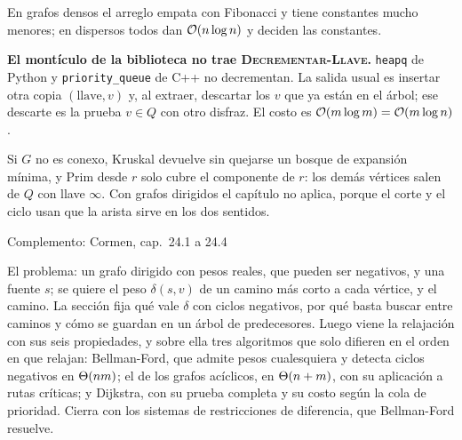 \documentclass[11pt,letterpaper]{article}
\begin{document}
En grafos densos el arreglo empata con Fibonacci y tiene constantes
mucho menores; en dispersos todos dan $\mathcal{O}\!\left(n \log n\right)$ y deciden las
constantes.

\begin{ojo}
  \textbf{El montículo de la biblioteca no trae
  \textsc{Decrementar-Llave}.} \texttt{heapq} de Python y
  \texttt{priority\_queue} de C++ no decrementan. La salida usual es
  insertar otra copia $(\text{llave}, v)$ y, al extraer, descartar los
  $v$ que ya están en el árbol; ese descarte es la prueba $v \in Q$ con
  otro disfraz. El costo es $\mathcal{O}\!\left(m \log m\right) = \mathcal{O}\!\left(m \log n\right)$.
\end{ojo}

\begin{ojo}
  Si $G$ no es conexo, Kruskal devuelve sin quejarse un bosque de
  expansión mínima, y Prim desde $r$ solo cubre el componente de $r$:
  los demás vértices salen de $Q$ con llave $\infty$. Con grafos
  dirigidos el capítulo no aplica, porque el corte y el ciclo usan que
  la arista sirve en los dos sentidos.
\end{ojo}

\newpage


  {Complemento: Cormen, cap.\ 24.1 a 24.4}
\label{sec:caminos-fuente}

\begin{quick_sum}
  El problema: un grafo dirigido con pesos reales, que pueden ser
  negativos, y una fuente $s$; se quiere el peso $\delta(s, v)$ de un
  camino más corto a cada vértice, y el camino. La sección fija qué
  vale $\delta$ con ciclos negativos, por qué basta buscar entre
  caminos y cómo se guardan en un árbol de predecesores. Luego viene
  la relajación con sus seis propiedades, y sobre ella tres
  algoritmos que solo difieren en el orden en que relajan:
  Bellman-Ford, que admite pesos cualesquiera y detecta ciclos
  negativos en $\Theta\!\left(nm\right)$; el de los grafos acíclicos, en
  $\Theta\!\left(n + m\right)$, con su aplicación a rutas críticas; y Dijkstra, con
  su prueba completa y su costo según la cola de prioridad. Cierra con
  los sistemas de restricciones de diferencia, que Bellman-Ford
  resuelve.
\end{quick_sum}

\end{document}

